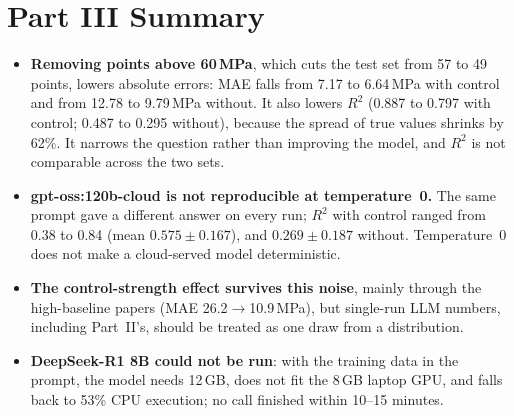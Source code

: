 \documentclass[11pt]{article}
\newcommand{\R}{$R^2$}
\begin{document}
\section{Part III Summary}
\label{sec:part3-summary}
\begin{itemize}\itemsep3pt
  \item \textbf{Removing points above 60\,MPa}, which cuts the test set from 57 to 49
        points, lowers absolute errors: MAE falls from 7.17 to 6.64\,MPa with control and
        from 12.78 to 9.79\,MPa without. It also lowers \R{} (0.887 to 0.797 with control;
        0.487 to 0.295 without), because the spread of true values shrinks by 62\%. It
        narrows the question rather than improving the model, and \R{} is not comparable
        across the two sets.
  \item \textbf{gpt-oss:120b-cloud is not reproducible at temperature~0.} The same
        prompt gave a different answer on every run; \R{} with control ranged from 0.38 to
        0.84 (mean $0.575\pm0.167$), and $0.269\pm0.187$ without. Temperature~0 does not
        make a cloud-served model deterministic.
  \item \textbf{The control-strength effect survives this noise}, mainly through the
        high-baseline papers (MAE 26.2$\to$10.9\,MPa), but single-run LLM numbers,
        including Part~II's, should be treated as one draw from a distribution.
  \item \textbf{DeepSeek-R1 8B could not be run}: with the training data in the prompt,
        the model needs 12\,GB, does not fit the 8\,GB laptop GPU, and falls back to
        53\% CPU execution; no call finished within 10--15 minutes.
\end{itemize}
\end{document}
